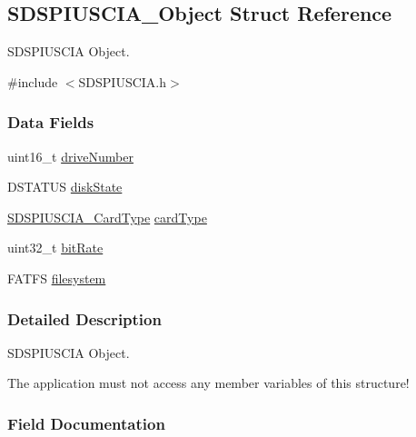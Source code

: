 \subsection{S\+D\+S\+P\+I\+U\+S\+C\+I\+A\+\_\+\+Object Struct Reference}
\label{struct_s_d_s_p_i_u_s_c_i_a___object}


S\+D\+S\+P\+I\+U\+S\+C\+I\+A Object.  




{\ttfamily \#include $<$S\+D\+S\+P\+I\+U\+S\+C\+I\+A.\+h$>$}

\subsubsection*{Data Fields}
\begin{DoxyCompactItemize}
\item 
uint16\+\_\+t \hyperlink{struct_s_d_s_p_i_u_s_c_i_a___object_a885e833c2dc6f823d1d9d54c80ad70b7}{drive\+Number}
\item 
D\+S\+T\+A\+T\+U\+S \hyperlink{struct_s_d_s_p_i_u_s_c_i_a___object_a480e38f59a4c875d6a5286f4236acb43}{disk\+State}
\item 
\hyperlink{_s_d_s_p_i_u_s_c_i_a_8h_a5852060f107db1a20619f34ec6bc1f07}{S\+D\+S\+P\+I\+U\+S\+C\+I\+A\+\_\+\+Card\+Type} \hyperlink{struct_s_d_s_p_i_u_s_c_i_a___object_a59c36212fa6b7bcc8f7d340b79085e52}{card\+Type}
\item 
uint32\+\_\+t \hyperlink{struct_s_d_s_p_i_u_s_c_i_a___object_a8b1960b8e1d77913620a580f68a73213}{bit\+Rate}
\item 
F\+A\+T\+F\+S \hyperlink{struct_s_d_s_p_i_u_s_c_i_a___object_ad56db692a9b386a9bddcbd989af74802}{filesystem}
\end{DoxyCompactItemize}


\subsubsection{Detailed Description}
S\+D\+S\+P\+I\+U\+S\+C\+I\+A Object. 

The application must not access any member variables of this structure! 

\subsubsection{Field Documentation}
